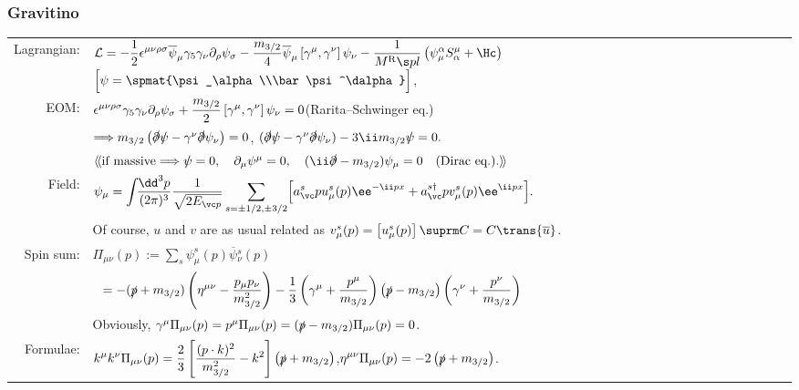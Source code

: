 
\subsubsection{Gravitino}
\begin{tabular}{r@{\ \ \ }l}
Lagrangian: & $\displaystyle \Lag=-\frac12\epsilon^{\mu\nu\rho\sigma}\overline\psi_\mu\G5\Gnd\Pr\psi_\sigma - \frac{m_{3/2}}{4}\overline\psi_\mu\left[\Gm,\Gn\right]\psi_\nu-\frac{1}{\rMPL}\left(\psi_\mu^\alpha S^\mu_\alpha+\Hc\right)$\qquad
$\Bigl[\psi=\spmat{\psi_\alpha\\\bar\psi^\dalpha}\Bigr]$,\\ 
EOM:&
$\displaystyle \epsilon^{\mu\nu\rho\sigma}\G5\Gnd\Pr\psi_\sigma+\frac{m_{3/2}}{2}\left[\Gm,\Gn\right]\psi_\nu=0$\quad (Rarita--Schwinger eq.)\\
&$\Longrightarrow m_{3/2}\left(\slashed\partial\slashed\psi-\gamma^{\nu}\slashed\partial\psi_\nu\right)=0$,\quad
 $(\slashed\partial\slashed\psi-\Gn\slashed\partial\psi_\nu)-3\ii m_{3/2}\slashed\psi=0.$\\
&$\langle\!\langle\text{if massive}\Longrightarrow \slashed \psi=0,\quad\Pm\psi^\mu=0,\quad(\ii\slashed\partial-m_{3/2})\psi_\mu=0\quad\text{(Dirac eq.)}.\rangle\!\rangle$
\\
Field:&
$\displaystyle \psi_\mu=\intdP{p} \frac{1}{\sqrt{2E_{\vc p}}}
     \sum_{s=\pm1/2,\pm3/2}\Bigl[a^s_\vc p u_\mu^s(p)\ee^{-\ii px} + a^{s\dagger}_\vc p v^s_\mu(p)\ee^{\ii px}\Bigr].$
\\
& Of course, $u$ and $v$ are as usual related as $v^s_\mu(p)=\left[u^s_\mu(p)\right]\suprm C=C\trans{\overline{u}}$.
\\
Spin sum:&
$\Pi_{\mu\nu}(p):= \sum_s\psi^s_\mu(p)\overline\psi{}^s_\nu(p)$
\\&\qquad\quad\ \,$\displaystyle=-(\slashed p+m_{3/2})\left(\eta^{\mu\nu}-\frac{p_\mu p_\nu}{m_{3/2}^2}\right)
-\frac13\left(\gamma^{\mu}+\frac{p^\mu}{m_{3/2}}\right)\left(\slashed p-m_{3/2}\right)\left(\gamma^{\nu}+\frac{p^\nu}{m_{3/2}}\right)$
\\
&Obviously, $\gamma^{\mu}\Pi_{\mu\nu}(p)=p^\mu\Pi_{\mu\nu}(p)=(\slashed p-m_{3/2})\Pi_{\mu\nu}(p)=0$.
\\
Formulae:&
     $\displaystyle k^\mu k^\nu \Pi_{\mu\nu}(p)=\frac23\left[\frac{(p\cdot k)^2}{m_{3/2}^2}-k^2\right]\left(\slashed p+m_{3/2}\right)$,\quad$\displaystyle \eta^{\mu\nu}\Pi_{\mu\nu}(p)=-2\left(\slashed p+m_{3/2}\right)$.
\end{tabular}



